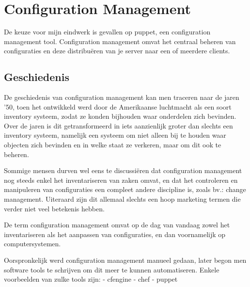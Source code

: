 \chapter{Configuration Management}

De keuze voor mijn eindwerk is gevallen op puppet, een configuration management tool. Configuration management omvat het centraal beheren van configuraties en deze distribu\"{e}ren van je server naar een of meerdere clients.


\section{Geschiedenis}

De geschiedenis van configuration management kan men traceren naar de jaren '50, toen het ontwikkeld werd door de Amerikaanse luchtmacht als een soort inventory systeem, zodat ze konden bijhouden waar onderdelen zich bevinden.
Over de jaren is dit getransformeerd in iets aanzienlijk groter dan slechts een inventory systeem,
namelijk een systeem om niet alleen bij te houden waar objecten zich bevinden en in welke staat ze verkeren, maar om dit ook te beheren.

Sommige mensen durven wel eens te discussi\"{e}ren dat configuration management nog steeds enkel het inventariseren van zaken omvat, en dat het controleren en manipuleren van configuraties een compleet andere discipline is, zoals bv.: change management. Uiteraard zijn dit allemaal slechts een hoop marketing termen die verder niet veel betekenis hebben.

De term configuration management omvat op de dag van vandaag zowel het inventariseren als het aanpassen van configuraties, en dan  voornamelijk op computersystemen.

Oorspronkelijk werd configuration management manueel gedaan, later begon men software tools te schrijven om dit meer te kunnen automatiseren.
Enkele voorbeelden van zulke tools zijn:
	- cfengine
	- chef
	- puppet
